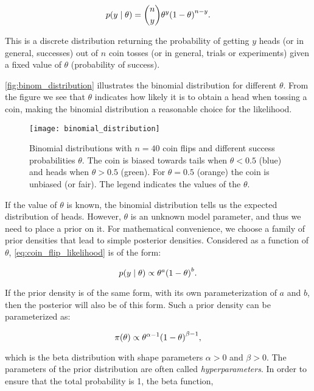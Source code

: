 \begin{equation}\label{eq:coin_flip_likelihood}
    p \qty(y \mid \theta) = \binom{n}{y} \theta^y \qty(1 - \theta)^{n-y}.
\end{equation}

This is a discrete distribution returning the probability of getting $y$ heads (or in general, successes) out of $n$ coin tosses (or in general, trials or experiments) given a fixed value of $\theta$ (probability of success). 

\autoref{fig:binom_distribution} illustrates the binomial distribution for different $\theta$. From the figure we see that $\theta$ indicates how likely it is to obtain a head when tossing a coin, making the binomial distribution a reasonable choice for the likelihood. 

\begin{figure}[ht]
    \centering
    \texttt{[image: binomial\_distribution]}
    \caption{Binomial distributions with $n=40$ coin flips and different success probabilities $\theta$. The coin is biased towards tails when $\theta < 0.5$ (blue) and heads when $\theta > 0.5$ (green). For $\theta=0.5$ (orange) the coin is unbiased (or fair). The legend indicates the values of the $\theta$.}
    \label{fig:binom_distribution}
\end{figure} 

If the value of $\theta$ is known, the binomial distribution tells us the expected distribution of heads. However, $\theta$ is an unknown model parameter, and thus we need to place a prior on it. For mathematical convenience, we choose a family of prior densities that lead to simple posterior densities. Considered as a function of $\theta$, \autoref{eq:coin_flip_likelihood} is of the form: 

\begin{equation*}
    p \qty(y \mid \theta) \propto \theta^a \qty(1 - \theta)^b.
\end{equation*} 

If the prior density is of the same form, with its own parameterization of $a$ and $b$, then the posterior will also be of this form. Such a prior density can be parameterized as: 

\begin{equation*}
    \pi \qty(\theta) \propto \theta^{\alpha - 1} \qty(1 - \theta)^{\beta -1},
\end{equation*}

which is the beta distribution with shape parameters $\alpha>0$ and $\beta>0$. The parameters of the prior distribution are often called \textit{hyperparameters}. In order to ensure that the total probability is 1, the beta function,

